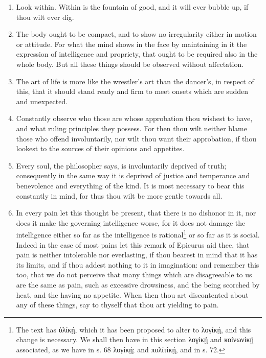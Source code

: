 \begin{enumerate}
\item Look within. Within is the fountain of good, and it will ever bubble up, if thou wilt ever dig.

\item The body ought to be compact, and to show no irregularity either in motion or attitude. For what the mind shows in the face by maintaining in it the expression of intelligence and propriety, that ought to be required also in the whole body. But all these things should be observed without affectation.

\item The art of life is more like the wrestler's art than the dancer's, in respect of this, that it should stand ready and firm to meet onsets which are sudden and unexpected.

\item Constantly observe who those are whose approbation thou wishest to have, and what ruling principles they possess. For then thou wilt neither blame those who offend involuntarily, nor wilt thou want their approbation, if thou lookest to the sources of their opinions and appetites.

\item Every soul, the philosopher says, is involuntarily deprived of truth; consequently in the same way it is deprived of justice and temperance and benevolence and everything of the kind. It is most necessary to bear this constantly in mind, for thus thou wilt be more gentle towards all.

\item In every pain let this thought be present, that there is no dishonor in it, nor does it make the governing intelligence worse, for it does not damage the intelligence either so far as the intelligence is rational\footnote{The text has \textgreek{ὑλίκῄ}, which it has been proposed to alter to \textgreek{λογίκῄ}, and this change is necessary. We shall then have in this section \textgreek{λογίκῄ} and \textgreek{κοίνωνίκῄ} associated, as we have in s. 68 \textgreek{λογίκῄ}; and \textgreek{πολίτίκῄ}, and in s. 72.} or so far as it is social. Indeed in the case of most pains let this remark of Epicurus aid thee, that pain is neither intolerable nor everlasting, if thou bearest in mind that it has its limits, and if thou addest nothing to it in imagination: and remember this too, that we do not perceive that many things which are disagreeable to us are the same as pain, such as excessive drowsiness, and the being scorched by heat, and the having no appetite. When then thou art discontented about any of these things, say to thyself that thou art yielding to pain.


\end{enumerate}
